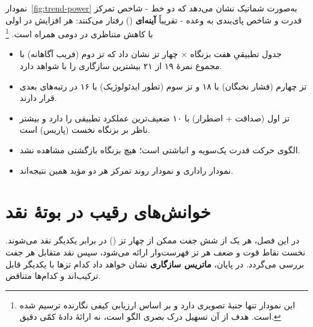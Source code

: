 \documentclass[12pt,a4paper]{book}
\newcommand{\keyword}[1]{\textbf{\textcolor{cPrimary}{#1}}}
\newcommand{\en}[1]{\lr{\textit{#1}}}
\begin{document}
نمودار~\ref{fig:trend-power} به‌صورت شماتیک نشان می‌دهد
که دو خط - شاخص تمرکز قدرت و شاخص پای‌بندی به وعده -
تقریباً \keyword{آینه‌ای} (\en{mirror-image})
رفتار می‌کنند:
هر افزایش در اولی با کاهش متناظری در دومی همراه است.%
\footnote{این نمودار تنها جنبهٔ تصویری دارد
و بر اساس ارزیابی کیفی نگارنده ترسیم شده است.
هدف از آن تسهیل درک بصری الگو است، نه ارائهٔ دادهٔ کمّی دقیق.}


\begin{principleBox}
\begin{itemize}
\item جدول تطبیقیِ هفت بزنگاه × چهار تز نشان داد که
      \textcolor{cAccent}{تز دوم (فریب آگاهانه)} با مجموع نمرهٔ ۱۹ از ۲۱
      بیشترین سازگاری را با شواهد دارد.
\item \textcolor{cConsolid}{تز چهارم (فشار نخبگان)} با ۱۸
      و \textcolor{cGold}{تز سوم (تطور ایدئولوژیک)} با ۱۶
      در رتبه‌های بعدی قرار دارند.
\item \textcolor{cGreen}{تز اول (صداقت + اضطرار)} با ۱۰
      ضعیف‌ترین عملکرد تطبیقی را دارد
      و بیشتر ناظر بر بزنگاه نخست (پاریس) است.
\item الگوی حرکت قدرت یک‌سویه و انباشتی است؛
      هیچ بزنگاه بازگشتی مشاهده نشد.
\item نمودار راداری و نمودار روند تمرکز
      هر دو مؤید همین نتیجه‌اند.
\end{itemize}
\end{principleBox}


\chapter{خوانش‌های رقیب در بوتهٔ نقد}
\label{ch:mutual-critique}

\begin{infoBox}
در این فصل، هر یک از شش جفت ممکن از چهار تز
(\en{$\binom{4}{2}=6$ pairs})
در برابر یکدیگر نقد می‌شوند.
نخست نقاط قوت و ضعف هر تز فهرست‌وار ارائه می‌شود،
سپس نقد متقابل هر جفت بررسی می‌گردد.
در پایان، \keyword{ماتریس سازگاری} نشان خواهد داد
کدام تزها با یکدیگر قابل ترکیب‌اند و کدام‌ها متناقض.
\end{infoBox}

\end{document}
